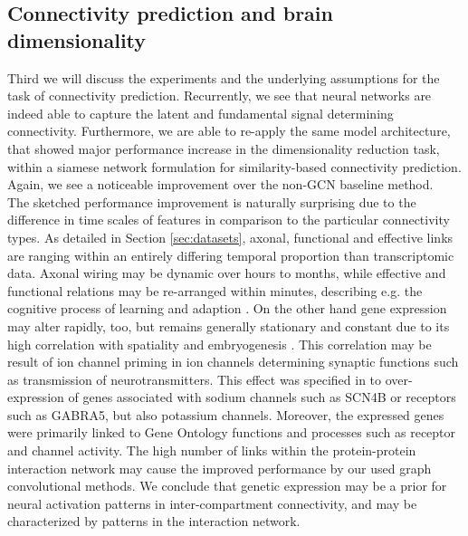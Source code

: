 \documentclass[]{article}
\renewcommand{\cite}{\citep}
\begin{document}
\subsection{Connectivity prediction and brain dimensionality}
\label{sec:disc_connpred}
Third we will discuss the experiments and the underlying assumptions for the task of connectivity prediction.
Recurrently, we see that neural networks are indeed able to capture the latent and fundamental signal determining connectivity. Furthermore, we are able to re-apply the same model architecture, that showed major performance increase in the dimensionality reduction task, within a siamese network formulation for similarity-based connectivity prediction. Again, we see a noticeable improvement over the non-GCN baseline method.\\

The sketched performance improvement is naturally surprising due to the difference in time scales of features in comparison to the particular connectivity types. As detailed in Section \ref{sec:datasets}, axonal, functional and effective links are ranging within an entirely differing temporal proportion than transcriptomic data. Axonal wiring may be dynamic over hours to months, while effective and functional relations may be re-arranged within minutes, describing e.g. the cognitive process of learning and adaption \cite{van2010exploring, friston1994functional, friston1993functional, sporns2016networks}. On the other hand gene expression may alter rapidly, too, but remains generally stationary and constant due to its high correlation with spatiality \cite{Partel2020, bohland2010clustering} and embryogenesis \cite{zapala2005adult, dillman2013mrna}. This correlation may be result of ion channel priming in ion channels determining synaptic functions such as transmission of neurotransmitters. This effect was specified in \citet{richiardi2015correlated} to over-expression of genes associated with sodium channels such as SCN4B or receptors such as GABRA5, but also potassium channels. Moreover, the expressed genes were primarily linked to Gene Ontology functions and processes \cite{GOoriginal2000, GOrecent2020} such as receptor and channel activity. The high number of links within the protein-protein interaction network may cause the improved performance by our used graph convolutional methods. We conclude that genetic expression may be a prior for neural activation patterns in inter-compartment connectivity, and may be characterized by patterns in the interaction network.\\
\end{document}
